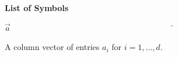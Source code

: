  
 
 
 
 
{\Huge\textbf{List of Symbols}}
\begin{tabbing}
$ \vec{a}$~~~~~~~~~~~~~~~~~~~~~~~~~~~~~~~~~~~~~~~~\=\parbox{4.5in}{A column vector of entries $a_i$ for $i=1,\dots,d$. \dotfill \pageref{symbol:vec} }\\


\end{tabbing}
